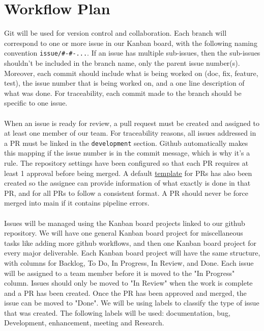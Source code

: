 \documentclass{article}
\begin{document}
\section{Workflow Plan}

Git will be used for version control and collaboration. Each branch will
correspond to one or more issue in our Kanban board, with the following naming
convention \texttt{issue/\#<issue-number1>-\#<issue-number2>-...}. If an issue
has multiple sub-issues, then the sub-issues shouldn't be included in the branch
name, only the parent issue number(s). Moreover, each commit should include what
is being worked on (doc, fix, feature, test), the issue number that is being
worked on, and a one line description of what was done. For traceability, each
commit made to the branch should be specific to one issue.\\\\

When an issue is ready for review, a pull request must be created and assigned
to at least one member of our team. For traceability reasons, all issues
addressed in a PR must be linked in the \texttt{development} section. Github
automatically makes this mapping if the issue number is in the commit message,
which is why it's a rule. The repository settings have been configured so that
each PR requires at least 1 approval before being merged. A default
\href{https://github.com/Team6-SixSense/audio360/blob/main/.github/pull_request_template.md}{template}
for PRs has also been created so the assignee can provide information of what
exactly is done in that PR, and for all PRs to follow a consistent format. A PR
should never be force merged into main if it contains pipeline errors.\\\\

Issues will be managed using the Kanban board projects linked to our github
repository. We will have one general Kanban board project for miscellaneous
tasks like adding more github workflows, and then one Kanban board project for
every major deliverable. Each Kanban board project will have the same structure,
with columns for Backlog, To Do, In Progress, In Review, and Done. Each issue
will be assigned to a team member before it is moved to the "In Progress"
column. Issues should only be moved to "In Review" when the work is complete and
a PR has been created. Once the PR has been approved and merged, the issue can
be moved to "Done". We will be using labels to classify the type of issue that
was created. The following labels will be used: documentation, bug, Development,
enhancement, meeting and Research.
\end{document}
